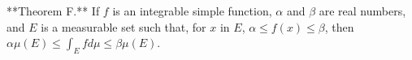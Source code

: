 **Theorem F.** If $f$ is an integrable simple function, $\alpha$ and $\beta$ are real numbers, and $E$ is a measurable set such that, for $x$ in $E$, $\alpha \leq f(x) \leq \beta$, then $\alpha \mu(E) \leq \int_E f d\mu \leq \beta \mu(E)$.
